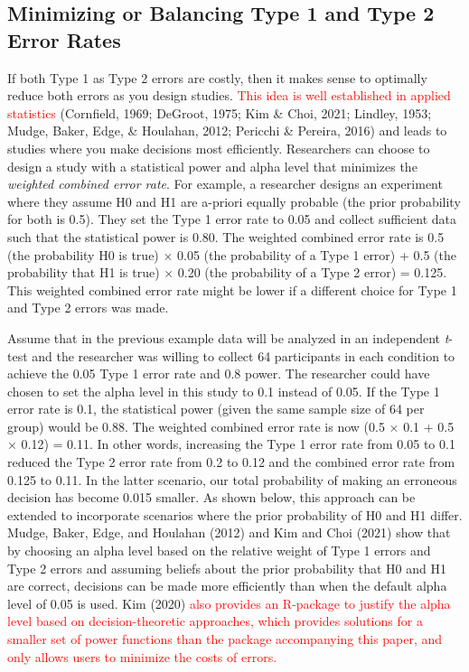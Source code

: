 \documentclass[
  english,
  ,man, a4paper,floatsintext]{apa6}
\begin{document}
\hypertarget{minimizing-or-balancing-type-1-and-type-2-error-rates}{%
\subsection{Minimizing or Balancing Type 1 and Type 2 Error Rates}\label{minimizing-or-balancing-type-1-and-type-2-error-rates}}

If both Type 1 as Type 2 errors are costly, then it makes sense to optimally reduce both errors as you design studies. \textcolor{red}{This idea is well established in applied statistics} (Cornfield, 1969; DeGroot, 1975; Kim \& Choi, 2021; Lindley, 1953; Mudge, Baker, Edge, \& Houlahan, 2012; Pericchi \& Pereira, 2016) and leads to studies where you make decisions most efficiently. Researchers can choose to design a study with a statistical power and alpha level that minimizes the \emph{weighted combined error rate}. For example, a researcher designs an experiment where they assume H0 and H1 are a-priori equally probable (the prior probability for both is 0.5). They set the Type 1 error rate to 0.05 and collect sufficient data such that the statistical power is 0.80. The weighted combined error rate is 0.5 (the probability H0 is true) × 0.05 (the probability of a Type 1 error) + 0.5 (the probability that H1 is true) × 0.20 (the probability of a Type 2 error) = 0.125. This weighted combined error rate might be lower if a different choice for Type 1 and Type 2 errors was made.

Assume that in the previous example data will be analyzed in an independent \emph{t}-test and the researcher was willing to collect 64 participants in each condition to achieve the 0.05 Type 1 error rate and 0.8 power. The researcher could have chosen to set the alpha level in this study to 0.1 instead of 0.05. If the Type 1 error rate is 0.1, the statistical power (given the same sample size of 64 per group) would be 0.88. The weighted combined error rate is now (0.5 × 0.1 + 0.5 × 0.12) = 0.11. In other words, increasing the Type 1 error rate from 0.05 to 0.1 reduced the Type 2 error rate from 0.2 to 0.12 and the combined error rate from 0.125 to 0.11. In the latter scenario, our total probability of making an erroneous decision has become 0.015 smaller. As shown below, this approach can be extended to incorporate scenarios where the prior probability of H0 and H1 differ. Mudge, Baker, Edge, and Houlahan (2012) and Kim and Choi (2021) show that by choosing an alpha level based on the relative weight of Type 1 errors and Type 2 errors and assuming beliefs about the prior probability that H0 and H1 are correct, decisions can be made more efficiently than when the default alpha level of 0.05 is used. Kim (2020) \textcolor{red}{also provides an R-package to justify the alpha level based on decision-theoretic approaches, which provides solutions for a smaller set of power functions than the package accompanying this paper, and only allows users to minimize the costs of errors.}
\end{document}
